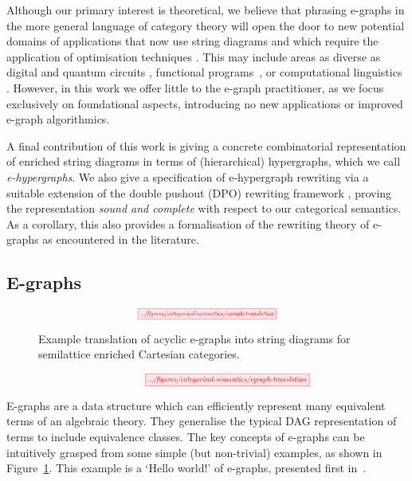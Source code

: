 Although our primary interest is theoretical, we believe that phrasing e-graphs in the more general language of category theory will open the door to new potential domains of applications that now use string diagrams and which require the application of optimisation techniques \cite{Selinger_2010, Hasegawa-traced}. 
This may include areas as diverse as digital \cite{ghica_compositional_2023} and quantum circuits
\cite{coecke_interacting_2011,ZX}, functional programs~\cite{ghica_hierarchical_2023}, or computational linguistics \cite{wazni_quantum_2022,coecke_lambek_2013}.  
However, in this work we offer little to the e-graph practitioner, as we focus exclusively on foundational aspects, introducing no new applications or improved e-graph algorithmics. 

A final contribution of this work is giving a concrete combinatorial representation of enriched string diagrams in terms of (hierarchical)  hypergraphs, which we call \textit{e-hypergraphs}.  We also give a specification of e-hypergraph rewriting via a suitable extension of the double pushout (DPO) rewriting framework 
\cite{dpo, bonchi_string_2022-1,bonchi_string_2022-2,bonchi_string_2022},  proving the representation \textit{sound and complete} with respect to our categorical semantics.  As a corollary, this also provides a formalisation of the rewriting theory of e-graphs as encountered in the literature. 

\subsection{E-graphs}

\ifdefined \ONECOLUMN
\begin{figure}
	\[
		\scalebox{0.55}{
		\tikzfig{../figures/categorical-semantics/egraph-translation}
		}
	\]
	\caption{Example translation of acyclic e-graphs into string diagrams for semilattice enriched Cartesian categories. }
	\label{fig:e-graph-example}
	\end{figure}
\else
\begin{figure*}
\[
	\hspace{1.3cm}
    \scalebox{0.65}{
    \tikzfig{../figures/categorical-semantics/egraph-translation}
    }
\]
\caption{Example translation of acyclic e-graphs into string diagrams for semilattice enriched Cartesian categories. }
\label{fig:e-graph-example}
\end{figure*}
\fi

E-graphs are a data structure which can efficiently represent many equivalent terms of an algebraic theory.  They generalise the typical DAG representation of terms to include equivalence classes. 
The key concepts of e-graphs can be intuitively grasped from some simple (but non-trivial) examples, as shown in Figure~\ref{fig:e-graph-example}.
This example is a `Hello world!' of e-graphs, presented first in~\cite{EggPaper}.

